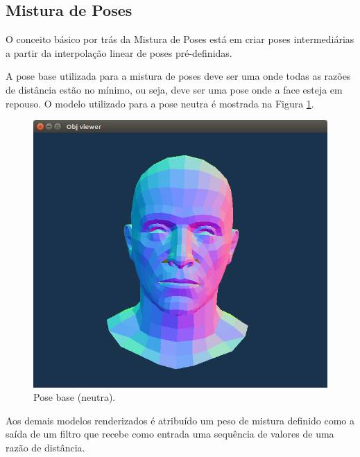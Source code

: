 \subsection{Mistura de Poses}

O conceito básico por trás da Mistura de Poses está em criar poses intermediárias a partir da interpolação linear de poses pré-definidas.

A pose base utilizada para a mistura de poses deve ser uma onde todas as razões de distância estão no mínimo, ou seja, deve ser uma pose onde a face esteja em repouso. O modelo utilizado para a pose neutra é mostrada na Figura \ref{fig:blend-shapes-base-model}.

\begin{figure}[!htb]
   \centering
  \includegraphics[width=0.8\linewidth]{./figs/rosto-neutro.png}
\caption{Pose base (neutra).}
\label{fig:blend-shapes-base-model}
\end{figure}

Aos demais modelos renderizados é atribuído um peso de mistura definido como a saída de um filtro que recebe como entrada uma sequência de valores de uma razão de distância.

